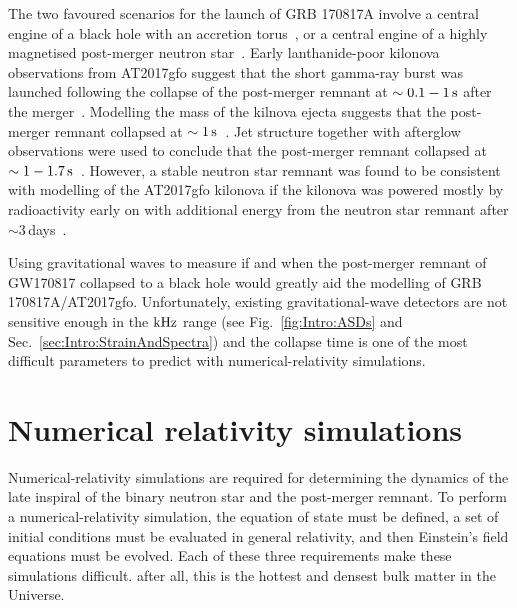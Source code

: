 \documentclass[../Thesis.tex]{subfiles}
\begin{document}
    The two favoured scenarios for the launch of GRB 170817A involve a central engine of a black hole with an accretion torus~\cite[e.g.,][]{Metzger2018,Gill2019,Murguia-Berthier2021}, or a central engine of a highly magnetised post-merger neutron star~\cite[e.g.,][]{Yu2018}.
    Early lanthanide-poor kilonova observations from AT2017gfo suggest that the short gamma-ray burst was launched following the collapse of the post-merger remnant at $\sim 0.1-1\,\mathrm{s}$ after the merger~\cite{Metzger2018}.
    Modelling the mass of the kilnova ejecta suggests that the post-merger remnant collapsed at $\sim 1\,\mathrm{s}$~\cite{Gill2019}.
    Jet structure together with afterglow observations were used to conclude that the post-merger remnant collapsed at $\sim 1-1.7\,\mathrm{s}$~\cite{Murguia-Berthier2021}.
    However, a stable neutron star remnant was found to be consistent with modelling of the AT2017gfo kilonova if the kilonova was powered mostly by radioactivity early on with additional energy from the neutron star remnant after $\sim 3\,$days~\cite{Yu2018}. \par
    
    Using gravitational waves to measure if and when the post-merger remnant of GW170817 collapsed to a black hole would greatly aid the modelling of GRB 170817A/AT2017gfo.
    Unfortunately, existing gravitational-wave detectors are not sensitive enough in the $\mathrm{kHz}$ range (see Fig.~\ref{fig:Intro:ASDs} and Sec.~\ref{sec:Intro:StrainAndSpectra}) and the collapse time is one of the most difficult parameters to predict with numerical-relativity simulations.

    \section{Numerical relativity simulations}

    
    Numerical-relativity simulations are required for determining the dynamics of the late inspiral of the binary neutron star and the post-merger remnant.
    To perform a numerical-relativity simulation, the equation of state must be defined, a set of initial conditions must be evaluated in general relativity, and then Einstein's field equations must be evolved.
    Each of these three requirements make these simulations difficult.
     after all, this is the hottest and densest bulk matter in the Universe.\par
\end{document}
